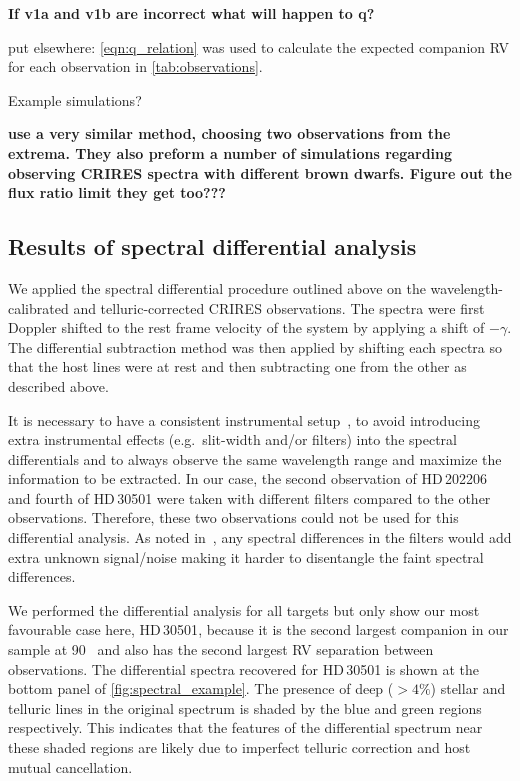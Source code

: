\textbf{If v1a and v1b are incorrect what will happen to q?}

{\red{} put elsewhere: \cref{eqn:q_relation} was used to calculate the expected companion {RV} for each observation in \cref{tab:observations}.}

Example simulations?

\textbf{\citet{kostogryz_spectral_2013} use a very similar method, choosing two observations from the extrema.
They also preform a number of simulations regarding observing CRIRES spectra with different brown dwarfs.
Figure out the flux ratio limit they get too???}

\subsection{Results of spectral differential analysis}
\label{subsec:differential_results}

We applied the spectral differential procedure outlined above on the wavelength-calibrated and telluric-corrected {CRIRES} observations.
The spectra were first Doppler shifted to the rest frame velocity of the system by applying a shift of \(-\gamma\).
The differential subtraction method was then applied by shifting each spectra so that the host lines were at rest and then subtracting one from the other as described above.

It is necessary to have a consistent instrumental setup~\citet{ferluga_separating_1997}, to avoid introducing extra instrumental effects (e.g.\ slit-width and/or filters) into the spectral differentials and to always observe the same wavelength range and maximize the information to be extracted.
In our case, the second observation of {HD\,202206} and fourth of {HD\,30501} were taken with different filters compared to the other observations.
Therefore, these two observations could not be used for this differential analysis.
As noted in~\citep{hadrava_disentangling_2009}, any spectral differences in the filters would add extra unknown signal/noise making it harder to disentangle the faint spectral differences.

We performed the differential analysis for all targets but only show our most favourable case here, {HD\,30501}, because it is the second largest companion in our sample at 90~\Mjup{} and also has the second largest {RV} separation between observations.
The differential spectra recovered for {HD\,30501} is shown at the bottom panel of \cref{fig:spectral_example}.
The presence of deep (\(>4\%\)) stellar and telluric lines in the original spectrum is shaded by the blue and green regions respectively.
This indicates that the features of the differential spectrum near these shaded regions are likely due to imperfect telluric correction and host mutual cancellation.

